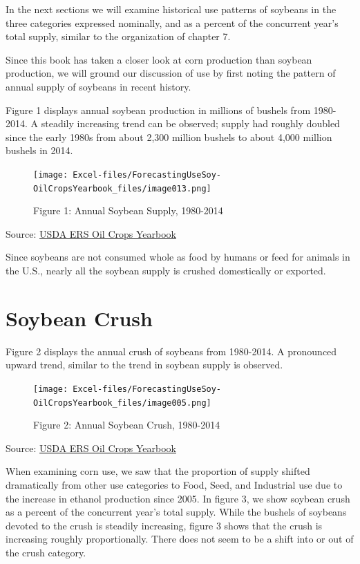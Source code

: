 \documentclass[
]{book}
\begin{document}
In the next sections we will examine historical use patterns of soybeans in the three categories expressed nominally, and as a percent of the concurrent year's total supply, similar to the organization of chapter 7.

Since this book has taken a closer look at corn production than soybean production, we will ground our discussion of use by first noting the pattern of annual supply of soybeans in recent history.

Figure 1 displays annual soybean production in millions of bushels from 1980-2014. A steadily increasing trend can be observed; supply had roughly doubled since the early 1980s from about 2,300 million bushels to about 4,000 million bushels in 2014.

\begin{figure}
\centering
\texttt{[image: Excel-files/ForecastingUseSoy-OilCropsYearbook\_files/image013.png]}
\caption{Figure 1: Annual Soybean Supply, 1980-2014}
\end{figure}

Source: \href{http://www.ers.usda.gov/data-products/oil-crops-yearbook.aspx}{USDA ERS Oil Crops Yearbook}

Since soybeans are not consumed whole as food by humans or feed for animals in the U.S., nearly all the soybean supply is crushed domestically or exported.

\hypertarget{soybean-crush}{%
\section{Soybean Crush}\label{soybean-crush}}

Figure 2 displays the annual crush of soybeans from 1980-2014. A pronounced upward trend, similar to the trend in soybean supply is observed.

\begin{figure}
\centering
\texttt{[image: Excel-files/ForecastingUseSoy-OilCropsYearbook\_files/image005.png]}
\caption{Figure 2: Annual Soybean Crush, 1980-2014}
\end{figure}

Source: \href{http://www.ers.usda.gov/data-products/oil-crops-yearbook.aspx}{USDA ERS Oil Crops Yearbook}

When examining corn use, we saw that the proportion of supply shifted dramatically from other use categories to Food, Seed, and Industrial use due to the increase in ethanol production since 2005. In figure 3, we show soybean crush as a percent of the concurrent year's total supply. While the bushels of soybeans devoted to the crush is steadily increasing, figure 3 shows that the crush is increasing roughly proportionally. There does not seem to be a shift into or out of the crush category.
\end{document}
